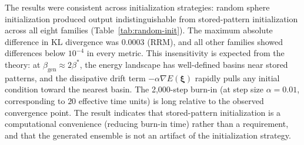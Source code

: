 \documentclass[10pt]{article}
\begin{document}
The results were consistent across initialization strategies: random sphere initialization produced output indistinguishable from stored-pattern initialization across all eight families (Table~\ref{tab:random-init}). The maximum absolute difference in KL divergence was $0.0003$ (RRM), and all other families showed differences below $10^{-4}$ in every metric. This insensitivity is expected from the theory: at $\beta_{\mathrm{gen}} \approx 2\beta^*$, the energy landscape has well-defined basins near stored patterns, and the dissipative drift term $-\alpha\nabla E(\boldsymbol{\xi})$ rapidly pulls any initial condition toward the nearest basin. The 2{,}000-step burn-in (at step size $\alpha{=}0.01$, corresponding to $20$ effective time units) is long relative to the observed convergence point. The result indicates that stored-pattern initialization is a computational convenience (reducing burn-in time) rather than a requirement, and that the generated ensemble is not an artifact of the initialization strategy.
\end{document}
